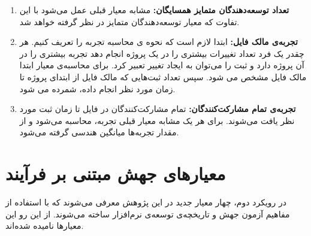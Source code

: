 \begin{enumerate}
\item
\textbf{تعداد توسعه‌دهندگان متمایز همسایگان:}
مشابه معیار قبلی عمل می‌شود با این تفاوت که معیار توسعه‌دهندگان متمایز در نظر گرفته خواهد شد.
\item
\textbf{تجربه‌ی مالک فایل:}
 ابتدا لازم است که نحوه ی محاسبه تجربه را تعریف کنیم. هر چقدر یک فرد تعداد تغییرات بیشتری را در یک پروژه انجام دهد تجربه بیشتری را در آن پروژه دارد و ثبت را می‌توان به ایجاد تغییر تعبیر کرد. برای محاسبه‌ی معیار ابتدا مالک فایل مشخص می شود. سپس تعداد ثبت‌هایی که مالک فایل از ابتدای پروژه تا زمان مورد نظر انجام داده، شمرده می شود.
\item
\textbf{تجربه‌ی تمام مشارکت‌کنندگان:}
تمام مشارکت‌کنندگان در فایل تا زمان ثبت مورد نظر یافت می‌شوند. برای هر یک مشابه معیار قبلی تجربه، محاسبه می‌شود و از مقدار تجربه‌ها میانگین هندسی گرفته می‌شود. 

\end{enumerate}


\section{معیارهای جهش مبتنی بر فرآیند}
در رویکرد دوم، چهار معیار جدید در این پژوهش معرفی می‌شوند که با استفاده از مفاهیم آزمون جهش و تاریخچه‌ی توسعه‌ی نرم‌افزار ساخته می‌شوند. از این رو این معیارها   نامیده شده‌اند. 


